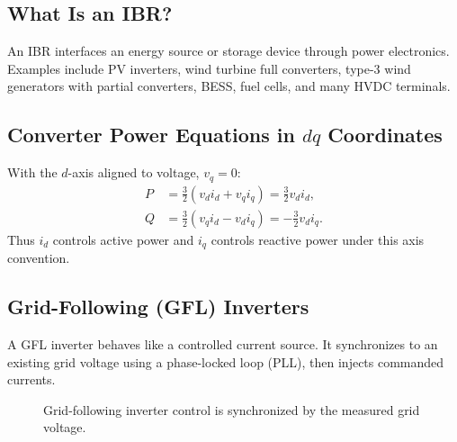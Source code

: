\documentclass[11pt]{article}
\begin{document}
\subsection{What Is an IBR?}
An IBR interfaces an energy source or storage device through power electronics.
Examples include PV inverters, wind turbine full converters, type-3 wind
generators with partial converters, BESS, fuel cells, and many HVDC terminals.

\subsection{Converter Power Equations in \texorpdfstring{$dq$}{dq} Coordinates}
With the $d$-axis aligned to voltage, $v_q=0$:
\begin{align}
P &= \frac{3}{2}(v_di_d+v_qi_q)=\frac{3}{2}v_di_d,\\
Q &= \frac{3}{2}(v_qi_d-v_di_q)=-\frac{3}{2}v_di_q.
\end{align}
Thus $i_d$ controls active power and $i_q$ controls reactive power under this
axis convention.

\subsection{Grid-Following (GFL) Inverters}
A GFL inverter behaves like a controlled current source. It synchronizes to an
existing grid voltage using a phase-locked loop (PLL), then injects commanded
currents.

\begin{figure}[h]
\centering
{}
\caption{Grid-following inverter control is synchronized by the measured grid voltage.}
\end{figure}
\end{document}
